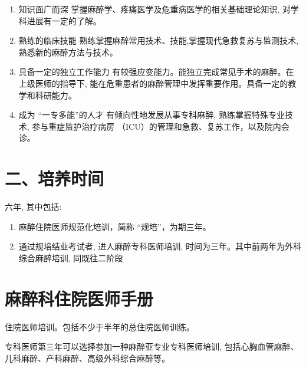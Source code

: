 \documentclass[10pt]{article}
\begin{document}
\begin{enumerate}
  \item 知识面广而深 掌握麻醉学、疼痛医学及危重病医学的相关基础理论知识, 对学科进展有一定的了解。

  \item 熟练的临床技能 熟练掌握麻醉常用技术、技能,掌握现代急救复苏与监测技术, 熟悉新的麻醉方法与技术。

  \item 具备一定的独立工作能力 有较强应变能力。能独立完成常见手术的麻醉。在上级医师的指导下, 能在危重患者的麻醉管理中发挥重要作用。具备一定的教学和科研能力。

  \item 成为 “一专多能”的人才 有倾向性地发展从事专科麻醉, 熟练掌握特殊专业技术, 参与重症监护治疗病房 （ICU）的管理和急救、复苏工作，以及院内会诊。

\end{enumerate}

\section*{二、培养时间}
六年, 其中包括:

\begin{enumerate}
  \item 麻醉住院医师规范化培训，简称 “规培”，为期三年。

  \item 通过规培结业考试者, 进人麻醉专科医师培训, 时间为三年。其中前两年为外科综合麻醉培训, 同既往二阶段

\end{enumerate}

\section*{麻醉科住院医师手册}
住院医师培训。包括不少于半年的总住院医师训练。

专科医师第三年可以选择参加一种麻醉亚专业专科医师培训, 包括心胸血管麻醉、儿科麻醉、产科麻醉、高级外科综合麻醉等。
\end{document}
